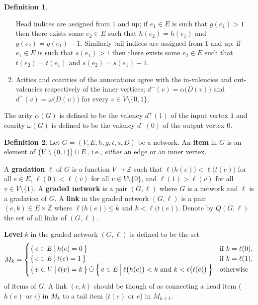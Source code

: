 \documentclass{article}
\makeatletter
\newcommand{\N}{\mathbb{N}}
\newcommand{\Z}{\mathbb{Z}}
\newcommand{\Fpil}{\longrightarrow}
\newcommand{\mc}{\mathcal}
\newcommand{\cupd}{\mathbin{\dot{{\cup}}}}
\newcommand*{\setOf}[3][\@gobble]{%
   \left\{ \, #2 \,\,\vrule\relax#1.\,\, #3 \, \right\}%
}
\theoremstyle{definition}
\newtheorem{definition}{Definition}
\providecommand*{\DefOrd}[2][]{\textbf{#2}}
\makeatother
\begin{document}
\begin{definition}
\begin{enumerate}
      Head indices are assigned from $1$ and up; if \(e_1 \in E\) is 
      such that \(g(e_1)>1\) then there exists some \(e_2 \in E\) such 
      that \(h(e_2)=h(e_1)\) and \(g(e_2) = g(e_1)-1\). Similarly 
      tail indices are assigned from $1$ and up; if \(e_1 \in E\) is 
      such that \(s(e_1)>1\) then there exists some \(e_2 \in E\) such 
      that \(t(e_2)=t(e_1)\) and \(s(e_2) = s(e_1)-1\).
    \item \label{A4:Network}
      Arities and coarities of the annotations agree with the 
      in-valencies and out-valencies respectively of the inner vertices; 
      \(d^-(v) = \alpha\bigl( D(v) \bigr)\) and 
      \(d^+(v) = \omega\bigl( D(v) \bigr)\) for every \(v \in V 
      \setminus \{0,1\}\).
  \end{enumerate}
  The arity $\alpha(G)$ is defined to be the valency $d^+(1)$ of the 
  input vertex $1$ and coarity $\omega(G)$ is defined to be the 
  valency \(d^-(0)\) of the output vertex $0$.
\end{definition}


\begin{definition}
  Let $G=(V,E,h,g,t,s,D)$ be a network. An \DefOrd{item} in $G$ is an 
  element of $\bigl( V \setminus\nobreak \{0,1\} \bigr) \cupd E$, i.e., 
  \emph{either} an edge or an inner vertex.
  
  A \DefOrd{gradation} $\ell$ of $G$ is a function \(V \Fpil \Z\) such 
  that \(\ell\bigl( h(e) \bigr) < \ell\bigl( t(e) \bigr) \) for all 
  \(e \in E\), \(\ell(0) < \ell(v)\) for all \(v \in V\setminus\{0\}\), 
  and \(\ell(1) > \ell(v)\) for all \(v \in V\setminus\{1\}\). A 
  \DefOrd{graded network} is a pair $(G,\ell)$ where $G$ is a network 
  and $\ell$ is a gradation of $G$. A \DefOrd{link} in the graded 
  network $(G,\ell)$ is a pair \((e,k) \in E \times \Z\) where 
  \(\ell\bigl( h(e) \bigr) \leqslant k\) and \(k < \ell\bigl( t(e) 
  \bigr)\). Denote by $Q(G,\ell)$ the set of all links of $(G,\ell)$.
  
  \DefOrd[*{level}]{Level} $k$ in the graded network $(G,\ell)$ is 
  defined to be the set
  \begin{equation*}
    M_k = \begin{cases}
      \setOf[\big]{ e \in E }{ h(e) = 0 }& \text{if \(k=\ell(0)\),}\\
      \setOf[\big]{ e \in E }{ t(e) = 1 }& \text{if \(k=\ell(1)\),}\\
      \setOf[\big]{ v \in V }{ \ell(v) = k } \cupd
        \setOf[\Big]{ e \in E }{ \ell\bigl( h(e) \bigr) < k
          \text{ and } k < \ell\bigl( t(e) \bigr) }
        & \text{otherwise}
     \end{cases}
  \end{equation*}
  of items of $G$. A link $(e,k)$ should be though of as connecting 
  a head item ($h(e)$ or $e$) in $M_k$ to a tail item ($t(e)$ or $e$) in 
  $M_{k+1}$. 
\end{definition}
\end{document}
